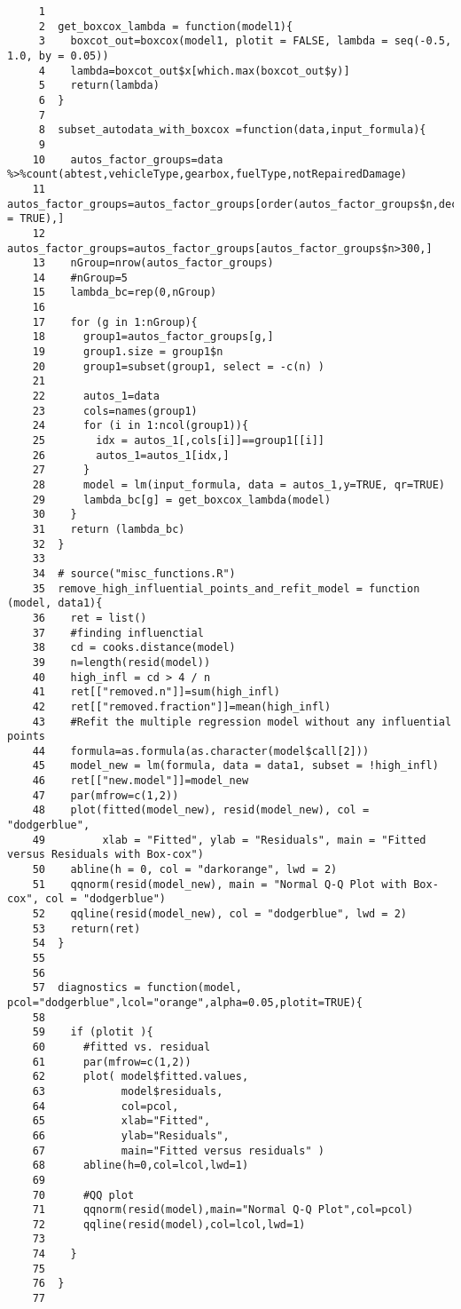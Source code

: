 \documentclass[]{article}
\begin{document}
\begin{verbatim}
     1  
     2  get_boxcox_lambda = function(model1){
     3    boxcot_out=boxcox(model1, plotit = FALSE, lambda = seq(-0.5, 1.0, by = 0.05))
     4    lambda=boxcot_out$x[which.max(boxcot_out$y)]
     5    return(lambda)
     6  }
     7  
     8  subset_autodata_with_boxcox =function(data,input_formula){
     9    
    10    autos_factor_groups=data %>%count(abtest,vehicleType,gearbox,fuelType,notRepairedDamage)
    11    autos_factor_groups=autos_factor_groups[order(autos_factor_groups$n,decreasing = TRUE),]
    12    autos_factor_groups=autos_factor_groups[autos_factor_groups$n>300,]
    13    nGroup=nrow(autos_factor_groups)
    14    #nGroup=5
    15    lambda_bc=rep(0,nGroup)
    16    
    17    for (g in 1:nGroup){
    18      group1=autos_factor_groups[g,]
    19      group1.size = group1$n
    20      group1=subset(group1, select = -c(n) )
    21      
    22      autos_1=data
    23      cols=names(group1)
    24      for (i in 1:ncol(group1)){
    25        idx = autos_1[,cols[i]]==group1[[i]]
    26        autos_1=autos_1[idx,]
    27      }
    28      model = lm(input_formula, data = autos_1,y=TRUE, qr=TRUE)
    29      lambda_bc[g] = get_boxcox_lambda(model)
    30    }
    31    return (lambda_bc)
    32  }
    33  
    34  # source("misc_functions.R")
    35  remove_high_influential_points_and_refit_model = function (model, data1){
    36    ret = list()
    37    #finding influenctial
    38    cd = cooks.distance(model)
    39    n=length(resid(model))
    40    high_infl = cd > 4 / n
    41    ret[["removed.n"]]=sum(high_infl) 
    42    ret[["removed.fraction"]]=mean(high_infl)
    43    #Refit the multiple regression model without any influential points
    44    formula=as.formula(as.character(model$call[2]))
    45    model_new = lm(formula, data = data1, subset = !high_infl)
    46    ret[["new.model"]]=model_new
    47    par(mfrow=c(1,2))
    48    plot(fitted(model_new), resid(model_new), col = "dodgerblue", 
    49         xlab = "Fitted", ylab = "Residuals", main = "Fitted versus Residuals with Box-cox")
    50    abline(h = 0, col = "darkorange", lwd = 2)
    51    qqnorm(resid(model_new), main = "Normal Q-Q Plot with Box-cox", col = "dodgerblue")
    52    qqline(resid(model_new), col = "dodgerblue", lwd = 2)
    53    return(ret)
    54  }
    55  
    56  
    57  diagnostics = function(model, pcol="dodgerblue",lcol="orange",alpha=0.05,plotit=TRUE){
    58    
    59    if (plotit ){
    60      #fitted vs. residual
    61      par(mfrow=c(1,2))
    62      plot( model$fitted.values,
    63            model$residuals, 
    64            col=pcol,
    65            xlab="Fitted",
    66            ylab="Residuals",
    67            main="Fitted versus residuals" )
    68      abline(h=0,col=lcol,lwd=1)
    69      
    70      #QQ plot
    71      qqnorm(resid(model),main="Normal Q-Q Plot",col=pcol)
    72      qqline(resid(model),col=lcol,lwd=1)
    73    
    74    }
    75  
    76  }
    77  
\end{verbatim}
\end{document}
